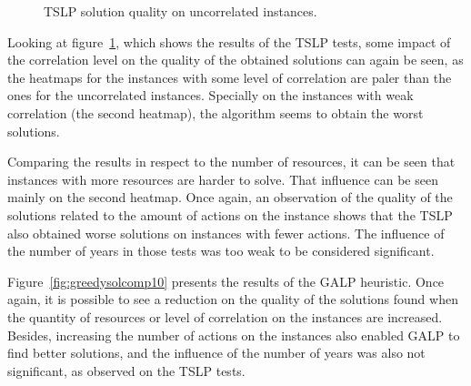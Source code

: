 \figspaces
\begin{figure}[H]
  \begin{center}
  \resizebox{\columnwidth}{!}{%
    \subfloat[1 resource]{} 
    \subfloat[2 resources]{}
    \subfloat[4 resources]{}
  }
  \end{center}
  \caption{TSLP solution quality on uncorrelated instances.}
  \label{fig:tabusolcomp10}
\end{figure}

Looking at figure~\ref{fig:tabusolcomp10}, which shows the results of the TSLP tests, some impact of
the correlation level on the quality of the obtained solutions can again be seen, as the heatmaps for the instances with some level of correlation
are paler than the ones for the uncorrelated instances. Specially on the instances with weak correlation (the second heatmap), the algorithm seems
to obtain the worst solutions.

Comparing the results in respect to the number of resources, it can be seen that instances with more resources are harder to solve. That influence
can be seen mainly on the second heatmap. Once again, an observation of the quality of the solutions related to the amount of actions on the instance
shows that the TSLP also obtained worse solutions on instances with fewer actions. The influence of the number of years in those tests was too weak to be 
considered significant.

Figure~\ref{fig:greedysolcomp10} presents the results of the GALP heuristic.
Once again, it is possible to see a reduction on the quality of the solutions found when the quantity of resources or level of correlation on
the instances are increased. Besides, increasing the number of actions on the instances also enabled GALP to find better solutions, and
the influence of the number of years was also not significant, as observed on the TSLP tests.

\begin{figure}[H]
  \begin{center}
  \resizebox{\columnwidth}{!}{%
    \subfloat[1 resource]{} 
    \subfloat[2 resources]{}
    \subfloat[4 resources]{} 
  }
  \end{center}
\end{figure}

